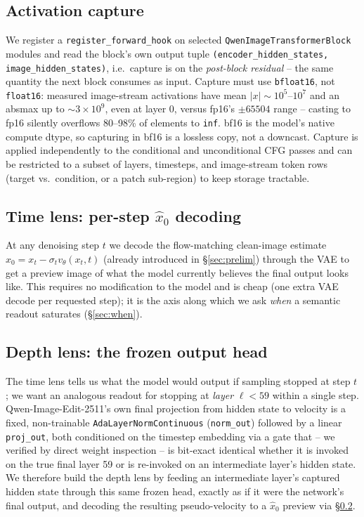 \documentclass[10pt,twocolumn,letterpaper]{article}
\newcommand{\model}{Qwen-Image-Edit-2511}
\begin{document}
\subsection{Activation capture}\label{sec:capture}
We register a \texttt{register\_forward\_hook} on selected
\texttt{QwenImageTransformerBlock} modules and read the block's own
output tuple \texttt{(encoder\_hidden\_states, image\_hidden\_states)},
i.e.\ capture is on the \emph{post-block residual} -- the same quantity
the next block consumes as input. Capture must use \texttt{bfloat16},
not \texttt{float16}: measured image-stream activations have mean
$|x|\sim10^5$--$10^7$ and an absmax up to $\sim3\times10^{9}$, even at
layer 0, versus fp16's $\pm65504$ range -- casting to fp16 silently
overflows 80--98\% of elements to \texttt{inf}. bf16 is the model's
native compute dtype, so capturing in bf16 is a lossless copy, not a
downcast. Capture is applied independently to the conditional and
unconditional CFG passes and can be restricted to a subset of layers,
timesteps, and image-stream token rows (target vs.\ condition, or a
patch sub-region) to keep storage tractable.

\subsection{Time lens: per-step $\hat{x}_0$ decoding}\label{sec:timelens}
At any denoising step $t$ we decode the flow-matching clean-image
estimate $\hat{x}_0 = x_t - \sigma_t v_\theta(x_t,t)$ (already
introduced in \S\ref{sec:prelim}) through the VAE to get a preview image
of what the model currently believes the final output looks like. This
requires no modification to the model and is cheap (one extra VAE decode
per requested step); it is the axis along which we ask \emph{when} a
semantic readout saturates (\S\ref{sec:when}).

\subsection{Depth lens: the frozen output head}\label{sec:depthlens}
The time lens tells us what the model would output if sampling stopped
at step $t$; we want an analogous readout for stopping at \emph{layer}
$\ell < 59$ within a single step. \model{}'s own final projection from
hidden state to velocity is a fixed, non-trainable
\texttt{AdaLayerNormContinuous} (\texttt{norm\_out}) followed by a linear
\texttt{proj\_out}, both conditioned on the timestep embedding via a
gate that -- we verified by direct weight inspection -- is bit-exact
identical whether it is invoked on the true final layer 59 or is
re-invoked on an intermediate layer's hidden state. We therefore build
the depth lens by feeding an intermediate layer's captured hidden state
through this same frozen head, exactly as if it were the network's
final output, and decoding the resulting pseudo-velocity to a
$\hat{x}_0$ preview via \S\ref{sec:timelens}.
\end{document}
